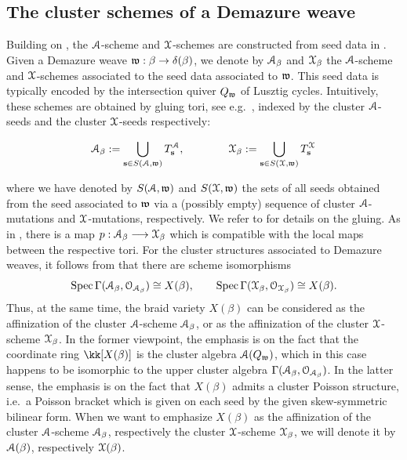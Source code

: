 \subsection{The cluster schemes of a Demazure weave}\label{ssec:A_and_X_schemes_weave} Building on \cite{FG2006,FG09}, the $\mathcal{A}$-scheme and $\mathcal{X}$-schemes are constructed from seed data in \cite[Section 2]{GHK15}. Given a Demazure weave $\mathfrak{w}:\beta\to\delta(\beta)$, we denote by $\mathcal{A}_\beta$ and $\mathcal{X}_\beta$ the $\mathcal{A}$-scheme and $\mathcal{X}$-schemes associated to the seed data associated to $\mathfrak{w}$. This seed data is typically encoded by the intersection quiver $Q_{\mathfrak{w}}$ of Lusztig cycles. Intuitively, these schemes are obtained by gluing tori, see e.g.~\cite[Appendix A]{GHKK18}, indexed by the cluster $\mathcal{A}$-seeds and the cluster $\mathcal{X}$-seeds respectively:

$$\displaystyle\mathcal{A}_\beta:=\bigcup_{{\bf s}\in S(\mathcal{A},\mathfrak{w})} T_{{\bf s}}^{\mathcal{A}},\qquad\qquad\displaystyle\mathcal{X}_\beta:=\bigcup_{{\bf s}\in S(\mathcal{X},\mathfrak{w})} T^{\mathcal{X}}_{{\bf s}}$$

\noindent where we have denoted by $S(\mathcal{A},\mathfrak{w})$ and $S(\mathcal{X},\mathfrak{w})$ the sets of all seeds obtained from the seed associated to $\mathfrak{w}$ via a (possibly empty) sequence of cluster $\mathcal{A}$-mutations and $\mathcal{X}$-mutations, respectively. We refer to \cite[Prop.~2.4]{GHK15} for details on the gluing. As in \cite[Remark 2.7.$(iii)$]{GHK15}, there is a map $p:\mathcal{A}_\beta\longrightarrow\mathcal{X}_\beta$ which is compatible with the local maps between the respective tori. For the cluster structures associated to Demazure weaves, it follows from \cite[Section 8]{CGGLSS25} that there are scheme isomorphisms
\begin{equation}\label{eq:scheme_iso}
\operatorname{Spec} \Gamma(\mathcal{A}_\beta,\mathcal{O}_{\mathcal{A}_\beta}) \cong X(\beta),\qquad \operatorname{Spec} \Gamma(\mathcal{X}_\beta,\mathcal{O}_{\mathcal{X}_\beta}) \cong X(\beta).
\end{equation}
\noindent Thus, at the same time, the braid variety $X(\beta)$ can be considered as the affinization of the cluster $\mathcal{A}$-scheme $\mathcal{A}_\beta$, or as the affinization of the cluster $\mathcal{X}$-scheme $\mathcal{X}_\beta$. In the former viewpoint, the emphasis is on the fact that the coordinate ring $\kk[X(\beta)]$ is the cluster algebra $\mathcal{A}(Q_{\mathfrak{w}})$, which in this case happens to be isomorphic to the upper cluster algebra $\Gamma(\mathcal{A}_\beta,\mathcal{O}_{\mathcal{A}_\beta})$. In the latter sense, the emphasis is on the fact that $X(\beta)$ admits a cluster Poisson structure, i.e.~a Poisson bracket which is given on each seed by the given skew-symmetric bilinear form. When we want to emphasize $X(\beta)$ as the affinization of the cluster $\mathcal{A}$-scheme $\mathcal{A}_\beta$, respectively the cluster $\mathcal{X}$-scheme $\mathcal{X}_\beta$, we will denote it by $\mathcal{A}(\beta)$, respectively $\mathcal{X}(\beta)$.\\

